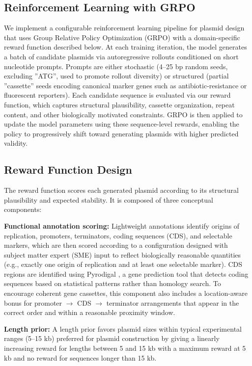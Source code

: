 \documentclass{article}
\theoremstyle{plain}
\theoremstyle{definition}
\theoremstyle{remark}
\begin{document}
\subsection{Reinforcement Learning with GRPO}

We implement a configurable reinforcement learning pipeline for plasmid
design that uses Group Relative Policy Optimization (GRPO) \cite{grpo}
with a domain-specific reward function described below. At each training
iteration, the model generates a batch of candidate plasmids via
autoregressive rollouts conditioned on short nucleotide prompts. Prompts
are either stochastic (4--25 bp random seeds, excluding ''ATG'', used to
promote rollout diversity) or structured (partial ''cassette'' seeds
encoding canonical marker genes such as antibiotic-resistance or
fluorescent reporters). Each candidate sequence is evaluated via our
reward function, which captures structural plausibility, cassette
organization, repeat content, and other biologically motivated
constraints. GRPO is then applied to update the model parameters using
these sequence-level rewards, enabling the policy to progressively shift
toward generating plasmids with higher predicted validity.

\subsection{Reward Function Design}

The reward function scores each generated plasmid according to its
structural plausibility and expected stability. It is composed of three
conceptual components:

\textbf{Functional annotation scoring:} Lightweight annotations identify
origins of replication, promoters, terminators, coding sequences (CDS),
and selectable markers, which are then scored according to a
configuration designed with subject matter expert (SME) input to reflect
biologically reasonable quantities (e.g., exactly one origin of
replication and at least one selectable marker). CDS regions are
identified using Pyrodigal \cite{prodigal}, a gene prediction tool that
detects coding sequences based on statistical patterns rather than
homology search. To encourage coherent gene cassettes, this component
also includes a location-aware bonus for promoter $\rightarrow$ CDS
$\rightarrow$ terminator arrangements that appear in the correct order
and within a reasonable proximity window.

\textbf{Length prior:} A length prior favors plasmid sizes within
typical experimental ranges (5--15 kb) preferred for plasmid
construction by giving a linearly increasing reward for lengths between 5 and 15 kb 
with a maximum reward at 5 kb and no reward for sequences longer than 15 kb.
\end{document}
